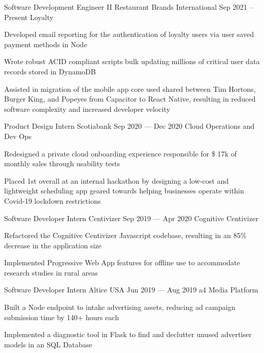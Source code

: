 \begin{cventries}
  \cventry
      {Software Development Engineer II}
      {Restaurant Brands International}
      {}
      {Sep 2021 -- Present}
      {Loyalty}
      {
        \begin{cvitems}
          \item {Developed email reporting for the authentication of loyalty users via user saved payment methods in Node}
          \item {Wrote robust ACID compliant scripts bulk updating millions of critical user data records stored in DynamoDB}
          \item {Assisted in migration of the mobile app core used shared between Tim Hortons, Burger King, and Popeyes from Capacitor to React Native, resulting in reduced software complexity and increased developer velocity}
        \end{cvitems}
      }
  \cventry
    {Product Design Intern}
    {Scotiabank}
    {}
    {Sep 2020 --- Dec 2020}
    {Cloud Operations and Dev Ops}
    {
      \begin{cvitems}
        \item {Redesigned a private cloud onboarding experience responsible for \$ 17k of monthly sales through usability tests}
        \item {Placed 1st overall at an internal hackathon by designing a low-cost and lightweight scheduling app geared towards helping businesses operate within Covid-19 lockdown restrictions}
      \end{cvitems}
    }
  \cventry
    {Software Developer Intern}
    {Centivizer}
    {}
    {Sep 2019 --- Apr 2020}
    {Cognitive Centivizer}
    {
      \begin{cvitems}
        \item {Refactored the Cognitive Centivizer Javascript codebase, resulting in an 85\% decrease in the application size}
        \item {Implemented Progressive Web App features for offline use to accommodate research studies in rural areas}
      \end{cvitems}
    }

  \cventry
    {Software Developer Intern}
    {Altice USA}
    {}
    {Jun 2019 --- Aug 2019}
    {a4 Media Platform}
    {
    \begin{cvitems}
      \item {Built a Node endpoint to intake advertising assets, reducing ad campaign submission time by 140+ hours each}
      \item {Implemented a diagnostic tool in Flask to find and declutter unused advertiser models in an SQL Database}
    \end{cvitems}
    }


\end{cventries}
